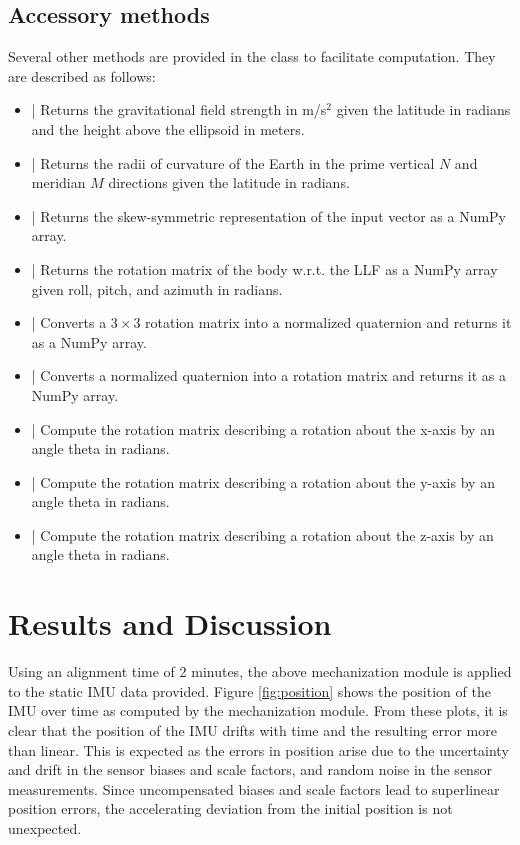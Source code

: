 \documentclass[11pt, oneside]{article}   	%
\begin{document}
\subsection{Accessory methods}
Several other methods are provided in the  class to facilitate computation.  They are described as follows:
\begin{itemize}
	\item {} | Returns the gravitational field strength in m/s$^2$ given the latitude in radians and the height above the ellipsoid in meters.
	\item {} | Returns the radii of curvature of the Earth in the prime vertical $N$ and meridian $M$ directions given the latitude in radians.
	\item {} | Returns the skew-symmetric representation of the input vector as a NumPy array.
	\item {} | Returns the rotation matrix of the body w.r.t. the LLF as a NumPy array given roll, pitch, and azimuth in radians.
	\item {} | Converts a $3\times3$ rotation matrix into a normalized quaternion and returns it as a NumPy array.
	\item {} | Converts a normalized quaternion into a rotation matrix and returns it as a NumPy array.
	\item {} | Compute the rotation matrix describing a rotation about the x-axis by an angle theta in radians.
	\item {} | Compute the rotation matrix describing a rotation about the y-axis by an angle theta in radians.
	\item {} | Compute the rotation matrix describing a rotation about the z-axis by an angle theta in radians.
\end{itemize}

\section{Results and Discussion}
Using an alignment time of 2 minutes, the above mechanization module is applied to the static IMU data provided. Figure \ref{fig:position} shows the position of the IMU over time as computed by the mechanization module.  From these plots, it is clear that the position of the IMU drifts with time and the resulting error more than linear.  This is expected as the errors in position arise due to the uncertainty and drift in the sensor biases and scale factors, and random noise in the sensor measurements.  Since uncompensated biases and scale factors lead to superlinear position errors, the accelerating deviation from the initial position is not unexpected.
\end{document}
